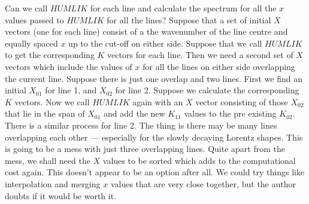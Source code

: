 \documentclass[12pt]{article}
\begin{document}
Can we call $HUMLIK$ for each line and calculate the spectrum {for all the $x$ values
passed to $HUMLIK$ for all the lines}? Suppose that a set of initial $X$ vectors (one for each line)
consist of a
the wavenumber of the line centre and equally spaced $x$ up to the cut-off on either side.
Suppose that we call $HUMLIK$ to get the corresponding $K$ vectors for each line.
Then we need a second set of  $X$ vectors which include the values of $x$ for all the lines
on either side overlapping the current line. Suppose there is just one overlap and two lines.
First we find an initial $X_{01}$ for line 1, and $X_{02}$ for line 2. Suppose we calculate the
corresponding $K$ vectors. Now we call $HUMLIK$ again with an $X$ vector consisting of those
$X_{02}$ that lie in the span of $X_{01}$ and add the new $K_{11}$ values to the pre existing $K_{02}$.
There is a similar process for line 2. The thing is there may be many lines overlapping each other
 --- especially for the slowly decaying Lorentz shapes. This is going to be a mess with just three
overlapping lines. Quite apart from the mess, we shall need the $X$ values to be sorted which adds
to the computational cost again. This doesn't appear to be an option after all. We could try
things like interpolation and merging $x$ values that are very close together, but the author doubts
 if it would be worth it.
\end{document}
